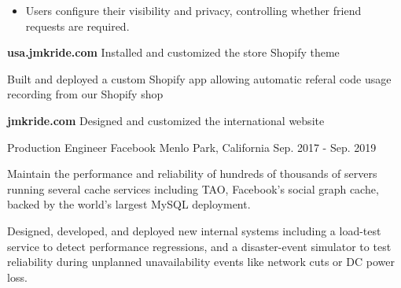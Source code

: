 \begin{cventries}
{\begin{cvitems}
{\begin{itemize}[leftmargin=0.5cm]
{            }
            \item{
              Users configure their visibility and privacy, controlling whether
              friend requests are required.
            }
          \end{itemize}
        }
        \item{
          \textbf{usa.jmkride.com}
          Installed and customized the store Shopify theme
        }
        \item{
          Built and deployed a custom Shopify app allowing automatic referal
          code usage recording from our Shopify shop
          \newline{}
        }
        \item{
          \textbf{jmkride.com}
          Designed and customized the international website
        }
      \end{cvitems}
    }

  \cventry
    {Production Engineer} %
    {Facebook} %
    {Menlo Park, California} %
    {Sep. 2017 - Sep. 2019} %
    {
      \begin{cvitems} %
        \item {
          Maintain the performance and reliability of hundreds of thousands
          of servers running several cache services including TAO, Facebook's
          social graph cache, backed by the world's largest MySQL deployment.
        }
        \item {
          Designed, developed, and deployed new internal systems including a
          load-test service to detect performance regressions, and a
          disaster-event simulator to test reliability during unplanned
          unavailability events like network cuts or DC power loss.
        }
      \end{cvitems}
    }


\end{cventries}
